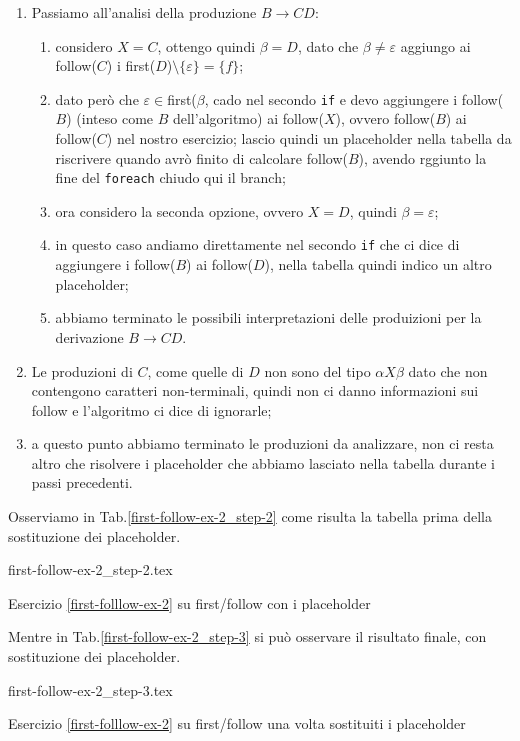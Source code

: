 \documentclass[class=book, crop=false, oneside, 12pt]{standalone}
\begin{document}
\begin{enumerate}
\begin{enumerate}
    \end{enumerate}
    \item Passiamo all'analisi della produzione \(B \to CD\):
    \begin{enumerate}
        \item considero \(X = C\), ottengo quindi \(\beta = D\), dato che \(\beta \neq \varepsilon\) aggiungo ai follow(\(C\)) i first(\(D\))\( \setminus \{\varepsilon\} = \{f\}\);
        \item dato però che \(\varepsilon \in \)first(\(\beta\), cado nel secondo \texttt{if} e devo aggiungere i follow(\(B\)) (inteso come \(B\) dell'algoritmo) ai follow(\(X\)), ovvero follow(\(B\)) ai follow(\(C\)) nel nostro esercizio; lascio quindi un placeholder nella tabella da riscrivere quando avrò finito di calcolare follow(\(B\)), avendo rggiunto la fine del \texttt{foreach} chiudo qui il branch;
        \item ora considero la seconda opzione, ovvero \(X = D\), quindi \(\beta = \varepsilon\);
        \item in questo caso andiamo direttamente nel secondo \texttt{if} che ci dice di aggiungere i follow(\(B\)) ai follow(\(D\)), nella tabella quindi indico un altro placeholder;
        \item abbiamo terminato le possibili interpretazioni delle produizioni per la derivazione \(B \to CD\).
    \end{enumerate}
    \item Le produzioni di \(C\), come quelle di \(D\) non sono del tipo \(\alpha X \beta\) dato che non contengono caratteri non-terminali, quindi non ci danno informazioni sui follow e l’algoritmo ci dice di ignorarle;
    \item a questo punto abbiamo terminato le produzioni da analizzare, non ci resta altro che risolvere i placeholder che abbiamo lasciato nella tabella durante i passi precedenti.
\end{enumerate}
Osserviamo in Tab.\ref{first-follow-ex-2_step-2} come risulta la tabella prima della sostituzione dei placeholder.
\begin{table}[H]
	\centering
	{first-follow-ex-2_step-2.tex}
    \caption{Esercizio \ref{first-folllow-ex-2} su first/follow con i placeholder}
    \label{first-follow-ex-2_step-2}
\end{table}
Mentre in Tab.\ref{first-follow-ex-2_step-3} si può osservare il risultato finale, con sostituzione dei placeholder.
\begin{table}[H]
	\centering
	{first-follow-ex-2_step-3.tex}
    \caption{Esercizio \ref{first-folllow-ex-2} su first/follow una volta sostituiti i placeholder}
    \label{first-follow-ex-2_step-3}
\end{table}
\end{document}
